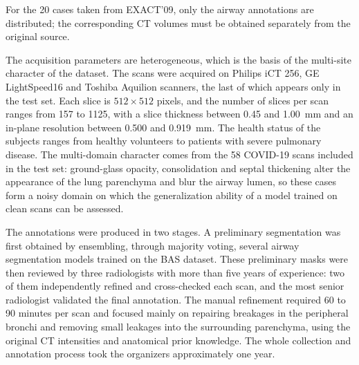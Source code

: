For the 20 cases taken from EXACT'09, only the airway annotations are
distributed; the corresponding CT volumes must be obtained separately from the
original source.

The acquisition parameters are heterogeneous, which is the basis of the
multi-site character of the dataset. The scans were acquired on Philips iCT 256,
GE LightSpeed16 and Toshiba Aquilion scanners, the last of which appears only in
the test set. Each slice is $512 \times 512$ pixels, and the number of slices per
scan ranges from 157 to 1125, with a slice thickness between 0.45 and 1.00~mm
and an in-plane resolution between 0.500 and 0.919~mm. The health status of the
subjects ranges from healthy volunteers to patients with severe pulmonary
disease. The multi-domain character comes from the 58 COVID-19 scans included in
the test set: ground-glass opacity, consolidation and septal thickening alter
the appearance of the lung parenchyma and blur the airway lumen, so these cases
form a noisy domain on which the generalization ability of a model trained on
clean scans can be assessed.

The annotations were produced in two stages. A preliminary segmentation was
first obtained by ensembling, through majority voting, several airway
segmentation models trained on the BAS dataset. These preliminary masks were
then reviewed by three radiologists with more than five years of experience: two
of them independently refined and cross-checked each scan, and the most senior
radiologist validated the final annotation. The manual refinement required 60 to
90 minutes per scan and focused mainly on repairing breakages in the peripheral
bronchi and removing small leakages into the surrounding parenchyma, using the
original CT intensities and anatomical prior knowledge. The whole collection and
annotation process took the organizers approximately one year.

